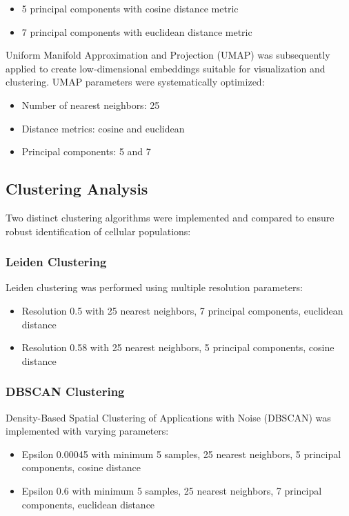\documentclass[12pt,a4paper]{article}
\begin{document}
\begin{itemize}
\item 5 principal components with cosine distance metric
\item 7 principal components with euclidean distance metric
\end{itemize}

Uniform Manifold Approximation and Projection (UMAP) was subsequently applied to create low-dimensional embeddings suitable for visualization and clustering. UMAP parameters were systematically optimized:

\begin{itemize}
\item Number of nearest neighbors: 25
\item Distance metrics: cosine and euclidean
\item Principal components: 5 and 7
\end{itemize}

\subsection{Clustering Analysis}

Two distinct clustering algorithms were implemented and compared to ensure robust identification of cellular populations:

\subsubsection{Leiden Clustering}
Leiden clustering was performed using multiple resolution parameters:
\begin{itemize}
\item Resolution 0.5 with 25 nearest neighbors, 7 principal components, euclidean distance
\item Resolution 0.58 with 25 nearest neighbors, 5 principal components, cosine distance
\end{itemize}

\subsubsection{DBSCAN Clustering}
Density-Based Spatial Clustering of Applications with Noise (DBSCAN) was implemented with varying parameters:
\begin{itemize}
\item Epsilon 0.00045 with minimum 5 samples, 25 nearest neighbors, 5 principal components, cosine distance
\item Epsilon 0.6 with minimum 5 samples, 25 nearest neighbors, 7 principal components, euclidean distance
\end{itemize}
\end{document}
